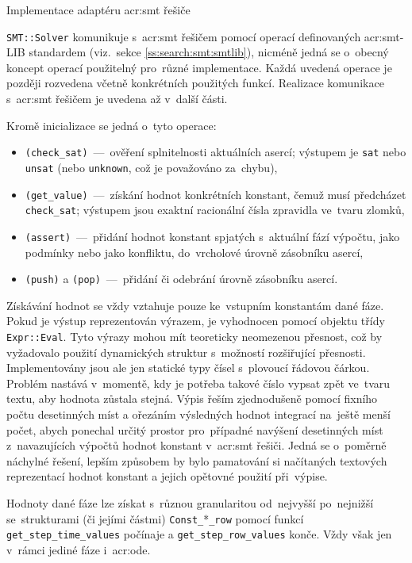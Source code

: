 \documentclass[thesis=M,czech]{FITthesis}[2012/06/26]
\newcommand{\acrlabel}[1]{acr:#1}
\newcommand{\acr}[1]{\acrshort{\acrlabel{#1}}}
\newcommand{\id}[1]{\texttt{#1}}
\newcommand{\rf}[1]{\ref{#1}}
\begin{document}
\begin{section}{Implementace adaptéru \acr{smt} řešiče}

\begin{paragraph}{\id{SMT::\-Solver}}\label{p:impl:smt:solver}
komunikuje s~\acr{smt} řešičem
pomocí operací definovaných \acr{smt}-LIB standardem
(viz.~sekce \rf{ss:search:smt:smtlib}),
nicméně jedná se o~obecný koncept operací
použitelný pro~různé implementace.
Každá uvedená operace je později rozvedena
včetně konkrétních použitých funkcí.
Realizace komunikace s~\acr{smt} řešičem
je uvedena až v~další části.

Kromě inicializace se jedná o~tyto operace:
\begin{itemize}
\item \id{(check\_\-sat)}~---~ověření splnitelnosti
   aktuálních asercí; výstupem je \id{sat} nebo \id{unsat}
   (nebo \id{unknown}, což je považováno za~chybu),
\item \id{(get\_\-value)}~---~získání hodnot
   konkrétních konstant, čemuž musí předcházet \id{check\_\-sat};
   výstupem jsou exaktní racionální čísla
   zpravidla ve~tvaru zlomků,
\item \id{(assert)}~---~přidání hodnot
   konstant spjatých s~aktuální fází výpočtu,
   jako podmínky nebo jako konfliktu,
   do~vrcholové úrovně zásobníku asercí,
\item \id{(push)} a \id{(pop)}~---~přidání či odebrání úrovně
   zásobníku asercí.
\end{itemize}

Získávání hodnot se vždy vztahuje pouze ke~vstupním konstantám
dané fáze. Pokud je výstup reprezentován výrazem,
je vyhodnocen pomocí objektu třídy \id{Expr::\-Eval}.
Tyto výrazy mohou mít teoreticky neomezenou přesnost,
což by vyžadovalo použití dynamických struktur
s~možností rozšiřující přesnosti.
Implementovány jsou ale jen statické typy
čísel s~plovoucí řádovou čárkou.
Problém nastává v~momentě,
kdy je potřeba takové číslo vypsat zpět ve~tvaru textu,
aby hodnota zůstala stejná.
Výpis řeším zjednodušeně pomocí fixního počtu desetinných míst
a ořezáním výsledných hodnot integrací na~ještě menší počet,
abych ponechal určitý prostor pro~případné navýšení desetinných míst
z~navazujících výpočtů hodnot konstant v~\acr{smt} řešiči.
Jedná se o~poměrně náchylné řešení,
lepším způsobem by bylo pamatování si načítaných textových reprezentací
hodnot konstant a jejich opětovné použití při~výpise.

Hodnoty dané fáze lze získat s~různou granularitou
od~nejvyšší po~nejnižší se~strukturami (či jejími částmi)
\id{Const\_\-}*\id{\_\-row}
pomocí funkcí \id{get\_\-step\_\-time\_\-values} počínaje
a \id{get\_\-step\_\-row\_\-values} konče.
Vždy však jen v~rámci jediné fáze i~\acr{ode}.


\end{paragraph}
\end{section}
\end{document}
